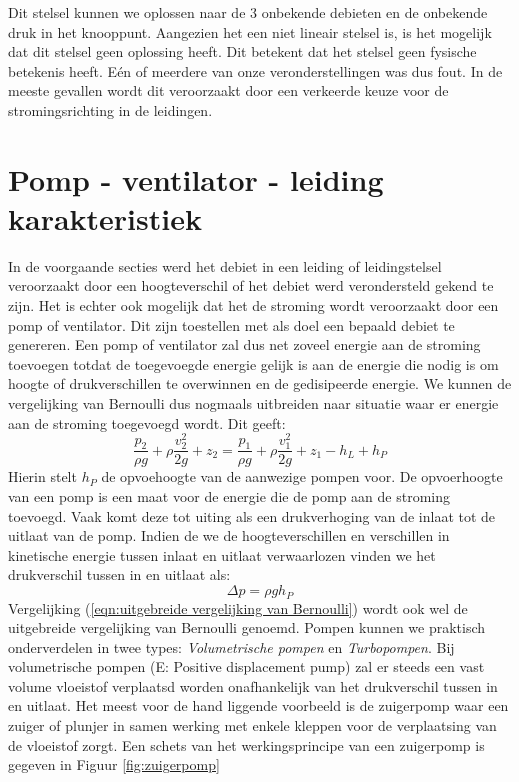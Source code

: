 Dit stelsel kunnen we oplossen naar de 3 onbekende debieten en de onbekende druk in het knooppunt. Aangezien het een niet lineair stelsel is, is het mogelijk dat dit stelsel geen oplossing heeft. Dit betekent dat het stelsel geen fysische betekenis heeft. E\'en of meerdere van onze veronderstellingen was dus fout. In de meeste gevallen wordt dit veroorzaakt door een verkeerde keuze voor de stromingsrichting in de leidingen.

	\FloatBarrier
	\section{Pomp - ventilator - leiding karakteristiek}
	\label{sec:Pomp - ventilator - leiding karakteristiek}
In de voorgaande secties werd het debiet in een leiding of leidingstelsel veroorzaakt door een hoogteverschil of het debiet werd verondersteld gekend te zijn. Het is echter ook mogelijk dat het de stroming wordt veroorzaakt door een pomp of ventilator. Dit zijn toestellen met als doel een bepaald debiet te genereren. Een pomp of ventilator zal dus net zoveel energie aan de stroming toevoegen totdat de toegevoegde energie gelijk is aan de energie die nodig is om hoogte of drukverschillen te overwinnen en de gedisipeerde energie. We kunnen de vergelijking van Bernoulli dus nogmaals uitbreiden naar situatie waar er energie aan de stroming toegevoegd wordt. Dit geeft: 
\begin{equation}
	\frac{p_2}{\rho g} + \rho \frac{v_2^2}{2 g}  + z_2 = \frac{p_1}{\rho g} + \rho \frac{v_1^2}{2 g}  + z_1 - h_L + h_P
	\label{eqn:uitgebreide vergelijking van Bernoulli}
\end{equation}
Hierin stelt $h_P$ de opvoehoogte van de aanwezige pompen voor. De opvoerhoogte van een pomp is een maat voor de energie die de pomp aan de stroming toevoegd. Vaak komt deze tot uiting als een drukverhoging van de inlaat tot de uitlaat van de pomp. Indien de we de hoogteverschillen en verschillen in kinetische energie tussen inlaat en uitlaat verwaarlozen vinden we het drukverschil tussen in en uitlaat als:
\begin{equation}
	\Delta p = \rho g h_P
\end{equation}
Vergelijking (\ref{eqn:uitgebreide vergelijking van Bernoulli}) wordt ook wel de uitgebreide vergelijking van Bernoulli genoemd.
\npar
Pompen kunnen we praktisch onderverdelen in twee types: \emph{Volumetrische pompen} en \emph{Turbopompen}. Bij volumetrische pompen (E: Positive displacement pump) zal er steeds een vast volume vloeistof verplaatsd worden onafhankelijk van het drukverschil tussen in en uitlaat. Het meest voor de hand liggende voorbeeld is de zuigerpomp waar een zuiger of plunjer in samen werking met enkele kleppen voor de verplaatsing van de vloeistof zorgt. Een schets van het werkingsprincipe van een zuigerpomp is gegeven in Figuur \ref{fig:zuigerpomp} 
